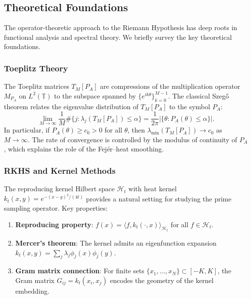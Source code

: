 \subsection{Theoretical Foundations}

The operator-theoretic approach to the Riemann Hypothesis has deep roots in functional analysis and spectral theory. We briefly survey the key theoretical foundations.

\subsubsection{Toeplitz Theory}

The Toeplitz matrices $T_M[P_A]$ are compressions of the multiplication operator $M_{P_A}$ on $L^2(\mathbb{T})$ to the subspace spanned by $\{e^{ik\theta}\}_{k=0}^{M-1}$. The classical Szeg\H{o} theorem relates the eigenvalue distribution of $T_M[P_A]$ to the symbol $P_A$:
\begin{equation}
  \lim_{M \to \infty} \frac{1}{M} \#\{j : \lambda_j(T_M[P_A]) \leq \alpha\} = \frac{1}{2\pi} |\{\theta : P_A(\theta) \leq \alpha\}|.
\end{equation}
In particular, if $P_A(\theta) \geq c_0 > 0$ for all $\theta$, then $\lambda_{\min}(T_M[P_A]) \to c_0$ as $M \to \infty$. The rate of convergence is controlled by the modulus of continuity of $P_A$, which explains the role of the Fej\'er--heat smoothing.

\subsubsection{RKHS and Kernel Methods}

The reproducing kernel Hilbert space $\mathcal{H}_t$ with heat kernel $k_t(x,y) = e^{-(x-y)^2/(4t)}$ provides a natural setting for studying the prime sampling operator. Key properties:
\begin{enumerate}
  \item \textbf{Reproducing property}: $f(x) = \langle f, k_t(\cdot, x)\rangle_{\mathcal{H}_t}$ for all $f \in \mathcal{H}_t$.
  \item \textbf{Mercer's theorem}: The kernel admits an eigenfunction expansion $k_t(x,y) = \sum_j \lambda_j \phi_j(x) \phi_j(y)$.
  \item \textbf{Gram matrix connection}: For finite sets $\{x_1, \ldots, x_N\} \subset [-K, K]$, the Gram matrix $G_{ij} = k_t(x_i, x_j)$ encodes the geometry of the kernel embedding.
\end{enumerate}

